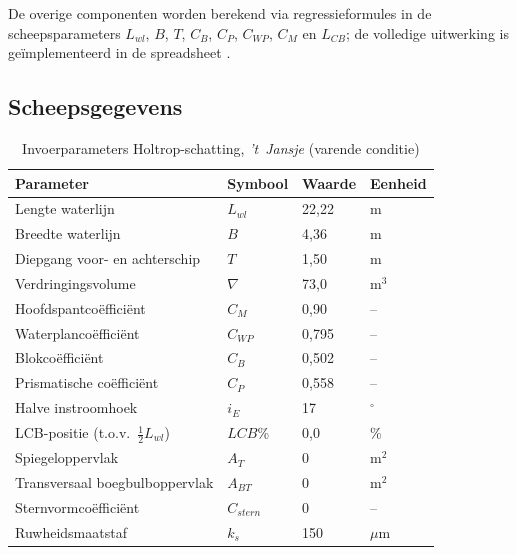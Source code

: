 De overige componenten worden berekend via regressieformules in de scheepsparameters
$L_{wl}$, $B$, $T$, $C_B$, $C_P$, $C_{WP}$, $C_M$ en $L_{CB}$; de volledige
uitwerking is geïmplementeerd in de spreadsheet \cite{spreadsheet_holtrop}.

\subsection{Scheepsgegevens}
\label{subsec:holtrop-scheepsgegevens}

\begin{table}[H]
\centering
\caption{Invoerparameters Holtrop-schatting, \emph{'t~Jansje} (varende conditie)}
\label{tab:holtrop_input}
\begin{tabular}{llll}
\toprule
Parameter & Symbool & Waarde & Eenheid \\
\midrule
Lengte waterlijn            & $L_{wl}$    & 22{,}22 & m        \\
Breedte waterlijn           & $B$         &  4{,}36 & m        \\
Diepgang voor- en achterschip & $T$       &  1{,}50 & m        \\
Verdringingsvolume          & $\nabla$    & 73{,}0  & m$^3$    \\
Hoofdspantcoëfficiënt       & $C_M$       &  0{,}90 & --       \\
Waterplancoëfficiënt        & $C_{WP}$    &  0{,}795& --       \\
Blokcoëfficiënt             & $C_B$       &  0{,}502& --       \\
Prismatische coëfficiënt    & $C_P$       &  0{,}558& --       \\
Halve instroomhoek          & $i_E$       & 17      & $^\circ$ \\
LCB-positie (t.o.v.\ $\tfrac{1}{2}L_{wl}$) & $LCB$\% & 0{,}0 & \% \\
Spiegeloppervlak            & $A_T$       & 0       & m$^2$    \\
Transversaal boegbulboppervlak & $A_{BT}$ & 0       & m$^2$    \\
Sternvormcoëfficiënt        & $C_{stern}$ & 0       & --       \\
Ruwheidsmaatstaf            & $k_s$       & 150     & $\mu$m   \\
\bottomrule
\end{tabular}
\end{table}

